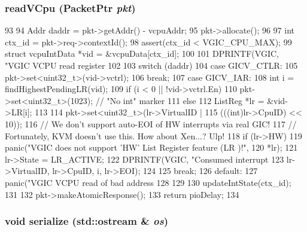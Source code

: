 \hypertarget{classVGic_ae1f51e39d49a7c6129c9092a9fc1f304}{
\subsubsection[{readVCpu}]{ readVCpu ({\bf PacketPtr} {\em pkt})}}
\label{classVGic_ae1f51e39d49a7c6129c9092a9fc1f304}



\begin{DoxyCode}
93 {
94     Addr daddr = pkt->getAddr() - vcpuAddr;
95     pkt->allocate();
96 
97     int ctx_id = pkt->req->contextId();
98     assert(ctx_id < VGIC_CPU_MAX);
99     struct vcpuIntData *vid = &vcpuData[ctx_id];
100 
101     DPRINTF(VGIC, "VGIC VCPU read register %
102 
103     switch (daddr) {
104       case GICV_CTLR:
105         pkt->set<uint32_t>(vid->vctrl);
106         break;
107       case GICV_IAR: {
108           int i = findHighestPendingLR(vid);
109           if (i < 0 || !vid->vctrl.En) {
110               pkt->set<uint32_t>(1023); // "No int" marker
111           } else {
112               ListReg *lr = &vid->LR[i];
113 
114               pkt->set<uint32_t>(lr->VirtualID |
115                                  (((int)lr->CpuID) << 10));
116               // We don't support auto-EOI of HW interrupts via real GIC!
117               // Fortunately, KVM doesn't use this.  How about Xen...? Ulp!
118               if (lr->HW)
119                   panic("VGIC does not support 'HW' List Register feature (LR %
      )!\n",
120                         *lr);
121               lr->State = LR_ACTIVE;
122               DPRINTF(VGIC, "Consumed interrupt %
123                       lr->VirtualID, lr->CpuID, i, lr->EOI);
124           }
125       } break;
126       default:
127         panic("VGIC VCPU read of bad address %
128     }
129 
130     updateIntState(ctx_id);
131 
132     pkt->makeAtomicResponse();
133     return pioDelay;
134 }
\end{DoxyCode}
\hypertarget{classVGic_a53e036786d17361be4c7320d39c99b84}{
\subsubsection[{serialize}]{\setlength{\rightskip}{0pt plus 5cm}void serialize (std::ostream \& {\em os})}}
\label{classVGic_a53e036786d17361be4c7320d39c99b84}



